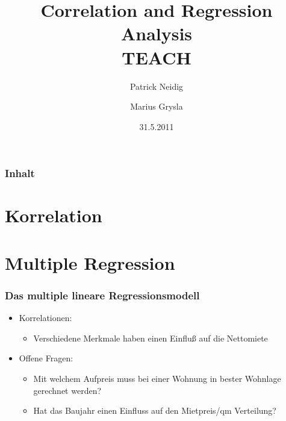 \documentclass{beamer}
\begin{document}
\title{Correlation and Regression Analysis\\
TEACH}
\author{Patrick Neidig \and Marius Grysla}
\date{31.5.2011}
\frame{\titlepage}

\begin{frame}
 \frametitle{Inhalt}
 \tableofcontents
\end{frame}

\section{Korrelation}
\begin{frame}
 
\end{frame}


\section{Multiple Regression}
\begin{frame}
 \frametitle{Das multiple lineare Regressionsmodell}
 \begin{itemize}
 \item Korrelationen:
   \begin{itemize}
   \item Verschiedene Merkmale haben einen Einfluß auf die Nettomiete
   \end{itemize}
 \item Offene Fragen:
   \begin{itemize}
   \item Mit welchem Aufpreis muss bei einer Wohnung in bester Wohnlage gerechnet werden?
   \item Hat das Baujahr einen Einfluss auf den Mietpreis/qm Verteilung?
   \end{itemize}
 \end{itemize}

 
\end{frame}
\end{document}

